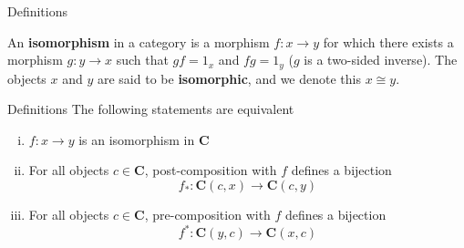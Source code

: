\documentclass[tikz]{beamer}
\theoremstyle{definition}
\begin{document}
\begin{frame}{Definitions}
    \begin{definition}[Isomorphism]
       An \textbf{isomorphism} in a category is a morphism $f: x \to y$ for which there exists a morphism $g: y \to x$ such that $gf = 1_x$ and $fg = 1_y$ ($g$ is a two-sided inverse). The objects $x$ and $y$ are said to be \textbf{isomorphic}, and we denote this $x \cong y$. 
    \end{definition}
    
\end{frame}{}
\begin{frame}{Definitions}
    The following statements are equivalent
    \begin{lemma}
        \begin{enumerate}[(i)]
            \item $f: x \to y$ is an isomorphism in $\mathbf{C}$
            \item For all objects $c \in \mathbf{C}$, post-composition with $f$ defines a bijection
                \begin{equation*}
                    f_*: \mathbf{C}(c, x) \to \mathbf{C}(c, y)
                \end{equation*}{}
            \item For all objects $c \in \mathbf{C}$, pre-composition with $f$ defines a bijection
                \begin{equation*}
                    f^*: \mathbf{C}(y, c) \to \mathbf{C}(x, c)
                \end{equation*}
        \end{enumerate}
    \end{lemma}
\end{frame}
\end{document}
